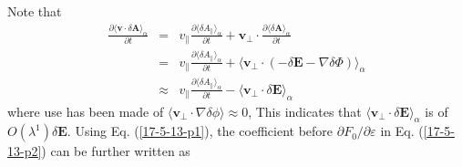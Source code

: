 \documentclass{llncs}
\begin{document}
Note that
\begin{eqnarray}
  \frac{\partial \langle \mathbf{v} \cdot \delta \mathbf{A}
  \rangle_{\alpha}}{\partial t} & = & v_{\parallel} \frac{\partial \langle
  \delta A_{\parallel} \rangle_{\alpha}}{\partial t} +\mathbf{v}_{\perp} \cdot
  \frac{\partial \langle \delta \mathbf{A} \rangle_{\alpha}}{\partial t}
  \nonumber\\
  & = & v_{\parallel} \frac{\partial \langle \delta A_{\parallel}
  \rangle_{\alpha}}{\partial t} + \langle \mathbf{v}_{\perp} \cdot (- \delta
  \mathbf{E}- \nabla \delta \Phi) \rangle_{\alpha} \nonumber\\
  & \approx & v_{\parallel} \frac{\partial \langle \delta A_{\parallel}
  \rangle_{\alpha}}{\partial t} - \langle \mathbf{v}_{\perp} \cdot \delta
  \mathbf{E} \rangle_{\alpha}  \label{17-5-13-p1}
\end{eqnarray}
where use has been made of $\langle \mathbf{v}_{\perp} \cdot \nabla \delta
\phi \rangle \approx 0$, This indicates that $\langle \mathbf{v}_{\perp} \cdot
\delta \mathbf{E} \rangle_{\alpha}$ is of $O (\lambda^1) \delta \mathbf{E}$.
Using Eq. (\ref{17-5-13-p1}), the coefficient before $\partial F_0 / \partial
\varepsilon$ in Eq. (\ref{17-5-13-p2}) can be further written as
\end{document}

